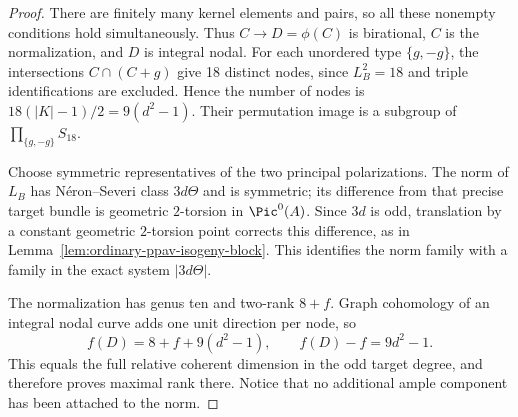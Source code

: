 \begin{proof}
There are finitely many kernel elements and pairs, so all these
nonempty conditions hold simultaneously. Thus $C\to D=\phi(C)$ is
birational, $C$ is the normalization, and $D$ is integral nodal.
For each unordered type $\{g,-g\}$, the intersections
$C\cap(C+g)$ give 18 distinct nodes, since $L_B^2=18$ and triple
identifications are excluded. Hence the number of nodes is
$18(|K|-1)/2=9(d^2-1)$. Their permutation image is a subgroup of
$\prod_{\{g,-g\}}S_{18}$.

Choose symmetric representatives of the two principal polarizations.
The norm of $L_B$ has N\'eron--Severi class $3d\Theta$ and is symmetric;
its difference from that precise target bundle is geometric
$2$-torsion in $\Pic^0(A)$. Since $3d$ is odd, translation by a
constant geometric $2$-torsion point corrects this difference,
as in Lemma~\ref{lem:ordinary-ppav-isogeny-block}.
This identifies the norm family with a family in the exact system
$|3d\Theta|$.

The normalization has genus ten and two-rank $8+f$.
Graph cohomology of an integral nodal curve adds one unit direction
per node, so
\[
             f(D)=8+f+9(d^2-1),\qquad
             f(D)-f=9d^2-1.
\]
This equals the full relative coherent dimension in the odd target
degree, and therefore proves maximal rank there. Notice that no
additional ample component has been attached to the norm.
\end{proof}

